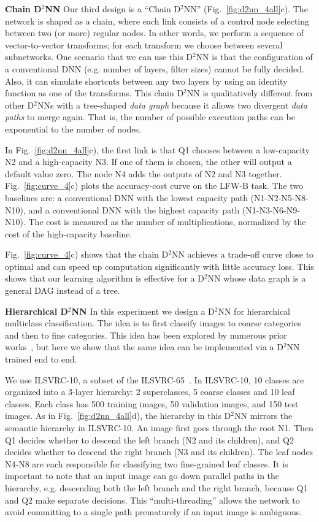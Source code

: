 \documentclass[10pt,twocolumn,letterpaper]{article}
\newcommand{\smallparagraph}[1]{\smallskip \noindent \textbf{#1}}
\begin{document}
\smallparagraph{Chain D$^2$NN}
Our third design is  a ``Chain D$^2$NN'' (Fig.~\ref{fig:d2nn_4all}c).
The network is shaped as a chain, where each link consists of a control node selecting between
two (or more) regular nodes. In other words, we perform a sequence of vector-to-vector transforms; for each transform
we choose between several subnetworks. 
One scenario that we can use this D$^2$NN is that the configuration of a conventional DNN (e.g. number of layers, filter sizes) cannot be fully decided. Also, it can simulate shortcuts between any two layers by using an identity function as one of the transforms.
This chain D$^2$NN is qualitatively
different from other D$^2$NNs with a tree-shaped \emph{data graph} because it allows
two divergent \emph{data paths} to merge again. That is, the number of possible execution paths can be exponential to the number of nodes.

In Fig.~\ref{fig:d2nn_4all}c),  the first link is that Q1 chooses between a
low-capacity N2 and a high-capacity N3. If one of them is chosen, the other
will output a default value zero. The node N4 adds the outputs of N2 and N3 together. 
Fig.~\ref{fig:curve_4}c) plots the accuracy-cost curve on the LFW-B 
task. The two baselines are: a conventional DNN with the lowest capacity path (N1-N2-N5-N8-N10), and a conventional DNN with the highest capacity path (N1-N3-N6-N9-N10). 
The cost is measured as the number of multiplications, normalized by the cost of the high-capacity baseline. 

Fig.~\ref{fig:curve_4}c) shows that the chain D$^2$NN achieves a trade-off
curve close to optimal and can speed up computation significantly with  little
accuracy loss.  This shows that our learning algorithm is effective for a
D$^2$NN whose data graph is a general DAG instead of a tree. 

\smallparagraph{Hierarchical D$^2$NN}
In this experiment we design a D$^2$NN for hierarchical multiclass
classification. The idea is to first classify images to coarse categories and then to
fine categories. This idea has been explored by numerous prior
works~\cite{liu2013probabilistic,bengio2010label,deng2011fast}, but here we show that
the same idea can be implemented via a D$^2$NN trained end to end.

We use ILSVRC-10, a subset of the ILSVRC-65~\cite{deng2012hedging}. In
ILSVRC-10, 10 classes are organized into a 3-layer hierarchy: 2 superclasses,
5 coarse classes and 10 leaf classes.
Each class has 500 training images, 50 validation images, and 150 test images. 
As in Fig.~\ref{fig:d2nn_4all}d), the hierarchy 
in this D$^2$NN mirrors the semantic hierarchy in ILSVRC-10.  An image
first goes through the root N1. Then Q1 decides whether to descend
the left branch (N2 and its children), and Q2 decides whether
to descend the right branch (N3 and its children). The leaf nodes N4-N8 are each responsible 
for classifying two fine-grained leaf classes. 
It is important to note that an input image can go down parallel paths in the
hierarchy, e.g. descending both the left branch and the right
branch, because Q1 and Q2 make separate decisions. This ``multi-threading'' allows the network to avoid
committing to a single path prematurely if an input image is ambiguous.
\end{document}
